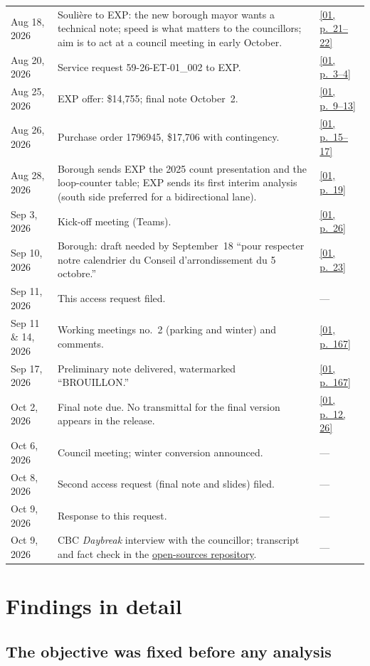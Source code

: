 \documentclass[11pt,letterpaper]{article}
\newcommand{\pagesurl}{https://openmobilitydata.github.io/Terrebonne-access-requests}
\newcommand{\osurl}{https://github.com/OpenMobilityData/Terrebonne-open-sources}
\newcommand{\pgl}[3]{\href{\pagesurl/\csname bundle#1\endcsname\#page=#2}{\textsf{\small[#1, p.~#3]}}}
\newcommand{\pg}[2]{\pgl{#1}{#2}{#2}}
\begin{document}
\begin{small}
\begin{longtable}{>{\raggedright\arraybackslash}p{2.6cm}>{\raggedright\arraybackslash}p{10.2cm}>{\raggedright\arraybackslash}p{2.0cm}}
Aug 18, 2026 & Soulière to EXP: the new borough mayor wants a technical note; speed is what matters to the councillors; aim is to act at a council meeting in early October. & \pgl{01}{21}{21--22} \\
Aug 20, 2026 & Service request 59-26-ET-01\_002 to EXP. & \pgl{01}{3}{3--4} \\
Aug 25, 2026 & EXP offer: \$14{,}755; final note October~2. & \pgl{01}{9}{9--13} \\
Aug 26, 2026 & Purchase order 1796945, \$17{,}706 with contingency. & \pgl{01}{15}{15--17} \\
Aug 28, 2026 & Borough sends EXP the 2025 count presentation and the loop-counter table; EXP sends its first interim analysis (south side preferred for a bidirectional lane). & \pg{01}{19} \\
Sep 3, 2026 & Kick-off meeting (Teams). & \pg{01}{26} \\
Sep 10, 2026 & Borough: draft needed by September~18 ``pour respecter notre calendrier du Conseil d'arrondissement du 5 octobre.'' & \pg{01}{23} \\
Sep 11, 2026 & This access request filed. & --- \\
Sep 11 \& 14, 2026 & Working meetings no.~2 (parking and winter) and comments. & \pg{01}{167} \\
Sep 17, 2026 & Preliminary note delivered, watermarked ``BROUILLON.'' & \pg{01}{167} \\
Oct 2, 2026 & Final note due. No transmittal for the final version appears in the release. & \pgl{01}{12}{12, 26} \\
Oct 6, 2026 & Council meeting; winter conversion announced. & --- \\
Oct 8, 2026 & Second access request (final note and slides) filed. & --- \\
Oct 9, 2026 & Response to this request. & --- \\
Oct 9, 2026 & CBC \emph{Daybreak} interview with the councillor; transcript and fact check in the \href{\osurl/tree/main/2026-cbc-daybreak-interview}{open-sources repository}. & --- \\
\bottomrule
\end{longtable}
\end{small}

\section{Findings in detail}

\subsection{The objective was fixed before any analysis}
\end{document}
